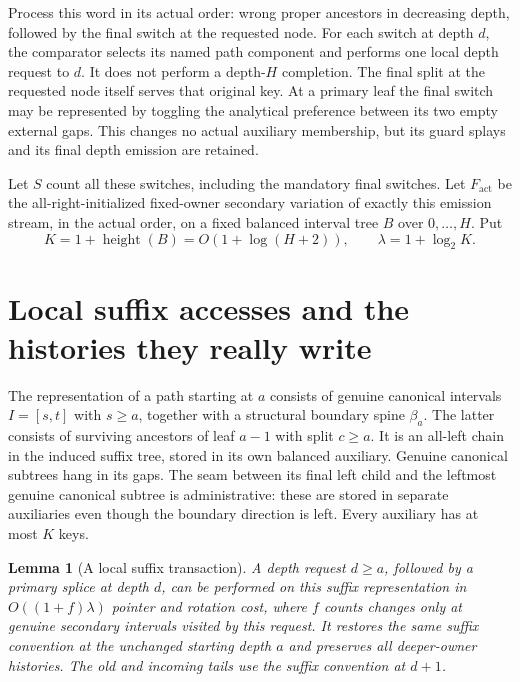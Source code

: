 \documentclass[11pt]{article}
\newtheorem{lemma}[theorem]{Lemma}
\begin{document}
Process this word in its actual order: wrong proper ancestors in
decreasing depth, followed by the final switch at the requested node.
For each switch at depth $d$, the comparator selects its named path
component and performs one local depth request to $d$. It does not
perform a depth-$H$ completion. The final split at the requested node
itself serves that original key. At a primary leaf the final switch
may be represented by toggling the analytical preference between its
two empty external gaps. This changes no actual auxiliary membership,
but its guard splays and its final depth emission are retained.

Let $S$ count all these switches, including the mandatory final
switches. Let $F_{\mathrm{act}}$ be the all-right-initialized fixed-owner
secondary variation of exactly this emission stream, in the actual
order, on a fixed balanced interval tree $B$ over $0,\ldots,H$. Put
\[
 K=1+\operatorname{height}(B)=O(1+\log(H+2)),\qquad
 \lambda=1+\log_2 K.
\]

\section{Local suffix accesses and the histories they really write}

The representation of a path starting at $a$ consists of genuine
canonical intervals $I=[s,t]$ with $s\ge a$, together with a structural
boundary spine $\beta_a$. The latter consists of surviving ancestors
of leaf $a-1$ with split $c\ge a$. It is an all-left chain in the
induced suffix tree, stored in its own balanced auxiliary. Genuine
canonical subtrees hang in its gaps. The seam between its final left
child and the leftmost genuine canonical subtree is administrative:
these are stored in separate auxiliaries even though the boundary
direction is left. Every auxiliary has at most $K$ keys.

\begin{lemma}[A local suffix transaction]\label{lem:suffix}
A depth request $d\ge a$, followed by a primary splice at depth $d$,
can be performed on this suffix representation in
$O((1+f)\lambda)$ pointer and rotation cost, where $f$ counts changes
only at genuine secondary intervals visited by this request. It restores
the same suffix convention at the unchanged starting depth $a$ and
preserves all deeper-owner histories. The old and incoming tails use
the suffix convention at $d+1$.
\end{lemma}
\end{document}
